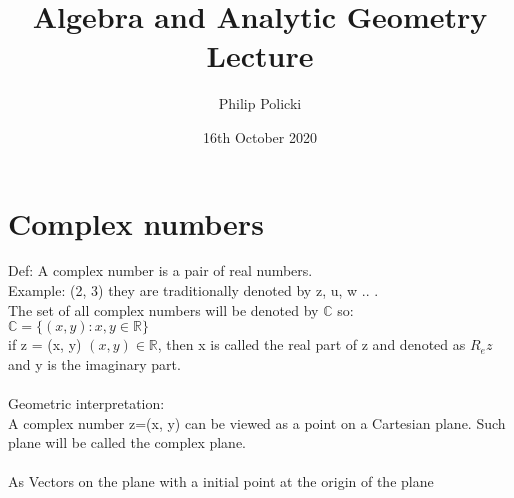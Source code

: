 \documentclass{article}
\title{Algebra and Analytic Geometry Lecture}
\author{Philip Policki}
\date{16th October 2020}
\begin{document}
\maketitle
\section{Complex numbers}
Def: A complex number is a pair of real numbers.\\
Example: (2, 3) they are traditionally denoted by z, u, w .. . \\
The set of all complex numbers will be denoted by $\mathbb{C}$ so: \\
$\mathbb{C} = \{(x, y): x, y \in \mathbb{R} \}$ \\
if z = (x, y) $(x, y) \in \mathbb{R}$, then x is called the real part of z and denoted as $R_ez$ and y is the imaginary part.\\ \\
Geometric interpretation: \\
A complex number z=(x, y) can be viewed as a point on a Cartesian plane. Such plane will be called the complex plane. \\ \\
As Vectors on the plane with a initial point at the origin of the plane \\ \\
\end{document}
